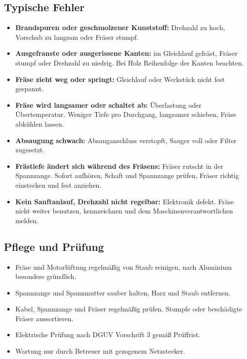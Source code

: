 \documentclass{\basedir/fablab-document}
\begin{document}
	\subsection{Typische Fehler}
	\begin{itemize}
		\item \textbf{Brandspuren oder geschmolzener Kunststoff:} Drehzahl zu hoch, Vorschub zu langsam oder Fräser stumpf.
		\item \textbf{Ausgefranste oder ausgerissene Kanten:} im Gleichlauf gefräst, Fräser stumpf oder Drehzahl zu niedrig. Bei Holz Reihenfolge der Kanten beachten.
		\item \textbf{Fräse zieht weg oder springt:} Gleichlauf oder Werkstück nicht fest gespannt.
		\item \textbf{Fräse wird langsamer oder schaltet ab:} Überlastung oder Übertemperatur. Weniger Tiefe pro Durchgang, langsamer schieben, Fräse abkühlen lassen.
		\item \textbf{Absaugung schwach:} Absauganschluss verstopft, Sauger voll oder Filter zugesetzt.
		\item \textbf{Frästiefe ändert sich während des Fräsens:} Fräser rutscht in der Spannzange. Sofort aufhören, Schaft und Spannzange prüfen, Fräser richtig einstecken und fest anziehen.
		\item \textbf{Kein Sanftanlauf, Drehzahl nicht regelbar:} Elektronik defekt. Fräse nicht weiter benutzen, kennzeichnen und dem Maschinenverantwortlichen melden.
	\end{itemize}

	\subsection{Pflege und Prüfung}
	\begin{itemize}
		\item Fräse und Motorlüftung regelmäßig von Staub reinigen, nach Aluminium besonders gründlich.
		\item Spannzange und Spannmutter sauber halten, Harz und Staub entfernen.
		\item Kabel, Spannzange und Fräser regelmäßig prüfen. Stumpfe oder beschädigte Fräser aussortieren.
		\item Elektrische Prüfung nach DGUV Vorschrift 3 gemäß Prüffrist.
		\item Wartung nur durch Betreuer mit gezogenem Netzstecker.
	\end{itemize}
\end{document}
